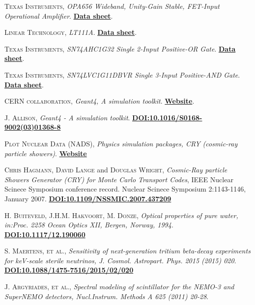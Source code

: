 \begin{thebibliography}{100}
 \textsc{Texas Instruments},
\textit{OPA656 Wideband, Unity-Gain Stable, FET-Input Operational Amplifier}. \href{https://www.ti.com/product/OPA656}{\textbf{Data sheet}}.

 \textsc{Linear Technology},
\textit{LT111A}. \href{https://datasheetspdf.com/pdf/57354/LinearTechnology/LT111/1}{\textbf{Data sheet}}.

 \textsc{Texas Instruments},
\textit{SN74AHC1G32 Single 2-Input Positive-OR Gate}. \href{https://www.ti.com/product/SN74AHC1G32}{\textbf{Data sheet}}.

 \textsc{Texas Instruments},
\textit{SN74LVC1G11DBVR Single 3-Input Positive-AND Gate}. \href{https://www.ti.com/store/ti/en/p/product/?p=SN74LVC1G11DBVR}{\textbf{Data sheet}}.

 \textsc{CERN collaboration}, 
\textit{Geant4, A simulation toolkit}. \href{https://geant4.web.cern.ch/node/1}{\textbf{Website}}.

 \textsc{J. Allison}, 
\textit{Geant4 - A simulation toolkit}. \href{https://doi.org/10.1016/S0168-9002(03)01368-8}{\textbf{DOI:10.1016/S0168-9002(03)01368-8}}

 \textsc{Plot Nuclear Data (NADS)}, 
\textit{Physics simulation packages, CRY (cosmic-ray particle showers)}. \href{https://nuclear.llnl.gov/simulation/}{\textbf{Website}}

 \textsc{Chris Hagmann}, \textsc{David Lange} and \textsc{Douglas Wright}, 
\textit{Cosmic-Ray particle Showers Generator (CRY) for Monte Carlo Transport Codes}, IEEE Nuclear Scinece Symposium conference record. Nuclear Scinece Symposium 2:1143-1146, January 2007. \href{https://www.researchgate.net/publication/4313740_Cosmic-ray_shower_generator_CRY_for_Monte_Carlo_transport_codes}{\textbf{DOI:10.1109/NSSMIC.2007.437209}}

 \textsc{H. Buiteveld}, \textsc{J.H.M. Hakvoort}, \textsc{M. Donze}, 
\textit{Optical properties of pure water, in:Proc. 2258 Ocean Optics XII, Bergen, Norway, 1994}. \href{https://www.spiedigitallibrary.org/conference-proceedings-of-spie/2258/1/Optical-properties-of-pure-water/10.1117/12.190060.short?SSO=1}{\textbf{DOI:10.1117/12.190060}}

 \textsc{S. Maertens}, \textsc{et al.},  \textit{Sensitivity of next-generation tritium beta-decay experiments for keV-scale sterile neutrinos, J. Cosmol. Astropart. Phys. 2015 (2015) 020}. \href{https://iopscience.iop.org/article/10.1088/1475-7516/2015/02/020}\textbf{DOI:10.1088/1475-7516/2015/02/020}

 \textsc{J. Argyriades}, \textsc{et al.},
\textit{Spectral modeling of scintillator for the NEMO-3 and SuperNEMO detectors, Nucl.Instrum. Methods A 625 (2011) 20-28}. \href{}{\textbf{}}

\end{thebibliography}